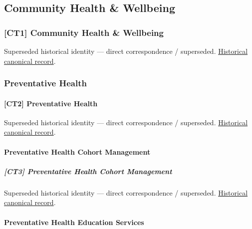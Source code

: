 \subsection{Community Health \& Wellbeing}

\subsubsection{[CT1] Community Health \& Wellbeing}

\par\label{element:175174c5cce549d2b154a4f6704721dc}
Superseded historical identity — direct correspondence / superseded. \href{../../../../continuum/strategy/capability/175174c5cce549d2b154a4f6704721dc.md}{Historical canonical record}.\par

\subsubsection{Preventative Health}

\paragraph{[CT2] Preventative Health}

\par\label{element:80affa7bcd284ecbbcbc5092f8497ddf}
Superseded historical identity — direct correspondence / superseded. \href{../../../../continuum/strategy/capability/80affa7bcd284ecbbcbc5092f8497ddf.md}{Historical canonical record}.\par

\paragraph{Preventative Health Cohort Management}

\subparagraph{[CT3] Preventative Health Cohort Management}

\par\label{element:fef479f0fd5048b19b2aec770f0233fe}
Superseded historical identity — direct correspondence / superseded. \href{../../../../continuum/strategy/capability/fef479f0fd5048b19b2aec770f0233fe.md}{Historical canonical record}.\par

\paragraph{Preventative Health Education Services}

